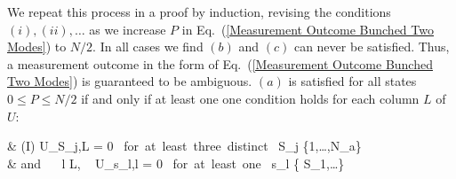 \documentclass[aps,pra,twocolumn,showpacs,superscriptaddress,floatfix,10pt]{revtex4}
\begin{document}
	We repeat this process in a proof by induction, revising the conditions $(i), (ii), \dots$ as we increase $P$ in Eq.~(\ref{Measurement Outcome Bunched Two Modes}) to $N/2$. In all cases we find $(b)$ and $(c)$ can never be satisfied. Thus, a measurement outcome in the form of Eq.~(\ref{Measurement Outcome Bunched Two Modes}) is guaranteed to be ambiguous. $(a)$ is satisfied for all states $ 0 \le P \le N/2 $ if and only if at least one one condition holds for each column $L$ of $U$:
	\begin{flalign}
	& \small(I) \enspace U_{S_j,L} = 0 \mbox{ for at least three distinct } S_j \in \{1,\dots,N_a\} \nonumber \\
	& \small \quad \quad \quad \mbox{and } \forall \mbox{ } l \ne L, \mbox{ } U_{s_l,l} = 0 \mbox{ for at least one } s_l \in \{ S_1,\dots \} \nonumber
	\end{flalign}
\end{document}
